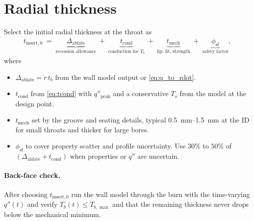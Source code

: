\documentclass[11pt]{article}
\begin{document}
\section{Radial thickness}
Select the initial radial thickness at the throat as
\begin{align}
  t_{\mathrm{insert,0}} \;=\;
  \underbrace{\Delta_{\mathrm{ablate}}}_{\text{recession allowance}}
  \;+\;
  \underbrace{t_{\mathrm{cond}}}_{\text{conduction for }T_b}
  \;+\;
  \underbrace{t_{\mathrm{mech}}}_{\text{lip, fit, strength}}
  \;+\;
  \underbrace{\phi_{\mathrm{sf}}}_{\text{safety factor}},
  \label{eq:thickness}
\end{align}
where
\begin{itemize}
  \item $\Delta_{\mathrm{ablate}}=\dot r\,t_b$ from the wall model output or \eqref{eq:q_to_rdot}.
  \item $t_{\mathrm{cond}}$ from \eqref{eq:tcond} with $q''_{\mathrm{peak}}$ and a conservative $T_s$ from the model at the design point.
  \item $t_{\mathrm{mech}}$ set by the groove and seating details, typical \SIrange{0.5}{1.5}{mm} at the ID for small throats and thicker for large bores.
  \item $\phi_{\mathrm{sf}}$ to cover property scatter and profile uncertainty. Use $30\%$ to $50\%$ of $(\Delta_{\mathrm{ablate}}+t_{\mathrm{cond}})$ when properties or $q''$ are uncertain.
\end{itemize}

\paragraph{Back-face check.}
After choosing $t_{\mathrm{insert,0}}$ run the wall model through the burn with the time-varying $q''(t)$ and verify $T_b(t)\le T_{b,\max}$ and that the remaining thickness never drops below the mechanical minimum.
\end{document}
